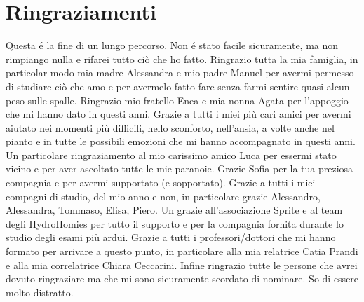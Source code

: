 \rhead[\fancyplain{}{\bfseries \leftmark}]{\fancyplain{}{\bfseries
\thepage}}
\clearpage{\pagestyle{empty}\cleardoublepage}
\chapter*{Ringraziamenti}
\thispagestyle{empty}
\noindent Questa é la fine di un lungo percorso. Non é stato facile sicuramente, ma non rimpiango nulla e rifarei tutto ciò che ho fatto.\newline
Ringrazio tutta la mia famiglia, in particolar modo mia madre Alessandra e mio padre Manuel per avermi permesso di studiare ciò che amo e per avermelo fatto fare senza farmi sentire quasi alcun peso sulle spalle.\newline
Ringrazio mio fratello Enea e mia nonna Agata per l'appoggio che mi hanno dato in questi anni.\newline
Grazie a tutti i miei più cari amici per avermi aiutato nei momenti più difficili, nello sconforto, nell'ansia, a volte anche nel pianto e in tutte le possibili emozioni che mi hanno accompagnato in questi anni.\newline
Un particolare ringraziamento al mio carissimo amico Luca per essermi stato vicino e per aver ascoltato tutte le mie paranoie.
Grazie Sofia per la tua preziosa compagnia e per avermi supportato (e sopportato).\newline
Grazie a tutti i miei compagni di studio, del mio anno e non, in particolare grazie Alessandro, Alessandra, Tommaso, Elisa, Piero.\newline
Un grazie all'associazione Sprite e al team degli HydroHomies per tutto il supporto e per la compagnia fornita durante lo studio degli esami più ardui.\newline
Grazie a tutti i professori/dottori che mi hanno formato per arrivare a questo punto, in particolare alla mia relatrice Catia Prandi e alla mia correlatrice Chiara Ceccarini.\newline
Infine ringrazio tutte le persone che avrei dovuto ringraziare ma che mi sono sicuramente scordato di nominare. So di essere molto distratto.